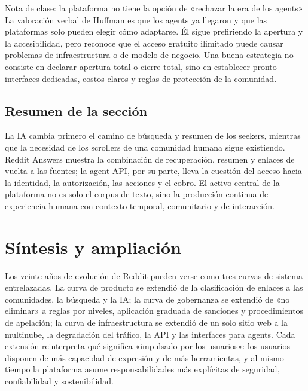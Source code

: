 \documentclass[a4paper]{article}
\begin{document}
\begin{warningbox}{Nota de clase: la plataforma no tiene la opción de «rechazar la era de los agents»}
La valoración verbal de Huffman es que los agents ya llegaron y que las plataformas solo pueden elegir cómo adaptarse. Él sigue prefiriendo la apertura y la accesibilidad, pero reconoce que el acceso gratuito ilimitado puede causar problemas de infraestructura o de modelo de negocio. Una buena estrategia no consiste en declarar apertura total o cierre total, sino en establecer pronto interfaces dedicadas, costos claros y reglas de protección de la comunidad.
\end{warningbox}

\subsection{Resumen de la sección}

La IA cambia primero el camino de búsqueda y resumen de los seekers, mientras que la necesidad de los scrollers de una comunidad humana sigue existiendo. Reddit Answers muestra la combinación de recuperación, resumen y enlaces de vuelta a las fuentes; la agent API, por su parte, lleva la cuestión del acceso hacia la identidad, la autorización, las acciones y el cobro. El activo central de la plataforma no es solo el corpus de texto, sino la producción continua de experiencia humana con contexto temporal, comunitario y de interacción.
\section{Síntesis y ampliación}

Los veinte años de evolución de Reddit pueden verse como tres curvas de sistema entrelazadas. La curva de producto se extendió de la clasificación de enlaces a las comunidades, la búsqueda y la IA; la curva de gobernanza se extendió de «no eliminar» a reglas por niveles, aplicación graduada de sanciones y procedimientos de apelación; la curva de infraestructura se extendió de un solo sitio web a la multinube, la degradación del tráfico, la API y las interfaces para agents. Cada extensión reinterpreta qué significa «impulsado por los usuarios»: los usuarios disponen de más capacidad de expresión y de más herramientas, y al mismo tiempo la plataforma asume responsabilidades más explícitas de seguridad, confiabilidad y sostenibilidad.
\end{document}
